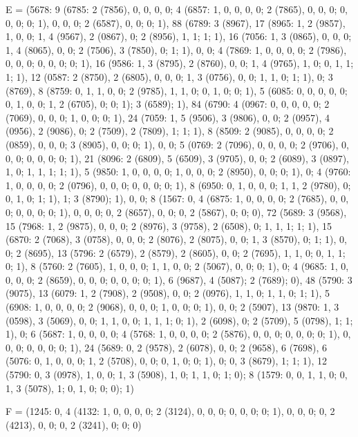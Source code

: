 {E = (5678: 9 (6785: 2 (7856), 0, 0, 0, 0; 4 (6857: 1, 0, 0, 0, 0; 2 (7865), 0, 0, 0; 0, 0, 0; 0; 1), 0, 0, 0; 2 (6587), 0, 0; 0; 1), 88 (6789: 3 (8967), 17 (8965: 1, 2 (9857), 1, 0, 0; 1, 4 (9567), 2 (0867), 0; 2 (8956), 1, 1; 1; 1), 16 (7056: 1, 3 (0865), 0, 0, 0; 1, 4 (8065), 0, 0; 2 (7506), 3 (7850), 0; 1; 1), 0, 0; 4 (7869: 1, 0, 0, 0, 0; 2 (7986), 0, 0, 0; 0, 0, 0; 0; 1), 16 (9586: 1, 3 (8795), 2 (8760), 0, 0; 1, 4 (9765), 1, 0; 0, 1, 1; 1; 1), 12 (0587: 2 (8750), 2 (6805), 0, 0, 0; 1, 3 (0756), 0, 0; 1, 1, 0; 1; 1), 0; 3 (8769), 8 (8759: 0, 1, 1, 0, 0; 2 (9785), 1, 1, 0; 0, 1, 0; 0; 1), 5 (6085: 0, 0, 0, 0, 0; 0, 1, 0, 0; 1, 2 (6705), 0; 0; 1); 3 (6589); 1), 84 (6790: 4 (0967: 0, 0, 0, 0, 0; 2 (7069), 0, 0, 0; 1, 0, 0; 0; 1), 24 (7059: 1, 5 (9506), 3 (9806), 0, 0; 2 (0957), 4 (0956), 2 (9086), 0; 2 (7509), 2 (7809), 1; 1; 1), 8 (8509: 2 (9085), 0, 0, 0, 0; 2 (0859), 0, 0, 0; 3 (8905), 0, 0; 0; 1), 0, 0; 5 (0769: 2 (7096), 0, 0, 0, 0; 2 (9706), 0, 0, 0; 0, 0, 0; 0; 1), 21 (8096: 2 (6809), 5 (6509), 3 (9705), 0, 0; 2 (6089), 3 (0897), 1, 0; 1, 1, 1; 1; 1), 5 (9850: 1, 0, 0, 0, 0; 1, 0, 0, 0; 2 (8950), 0, 0; 0; 1), 0; 4 (9760: 1, 0, 0, 0, 0; 2 (0796), 0, 0, 0; 0, 0, 0; 0; 1), 8 (6950: 0, 1, 0, 0, 0; 1, 1, 2 (9780), 0; 0, 1, 0; 1; 1), 1; 3 (8790); 1), 0, 0; 8 (1567: 0, 4 (6875: 1, 0, 0, 0, 0; 2 (7685), 0, 0, 0; 0, 0, 0; 0; 1), 0, 0, 0; 0, 2 (8657), 0, 0; 0, 2 (5867), 0; 0; 0), 72 (5689: 3 (9568), 15 (7968: 1, 2 (9875), 0, 0, 0; 2 (8976), 3 (9758), 2 (6508), 0; 1, 1, 1; 1; 1), 15 (6870: 2 (7068), 3 (0758), 0, 0, 0; 2 (8076), 2 (8075), 0, 0; 1, 3 (8570), 0; 1; 1), 0, 0; 2 (8695), 13 (5796: 2 (6579), 2 (8579), 2 (8605), 0, 0; 2 (7695), 1, 1, 0; 0, 1, 1; 0; 1), 8 (5760: 2 (7605), 1, 0, 0, 0; 1, 1, 0, 0; 2 (5067), 0, 0; 0; 1), 0; 4 (9685: 1, 0, 0, 0, 0; 2 (8659), 0, 0, 0; 0, 0, 0; 0; 1), 6 (9687), 4 (5087); 2 (7689); 0), 48 (5790: 3 (9075), 13 (6079: 1, 2 (7908), 2 (9508), 0, 0; 2 (0976), 1, 1, 0; 1, 1, 0; 1; 1), 5 (6908: 1, 0, 0, 0, 0; 2 (9068), 0, 0, 0; 1, 0, 0; 0; 1), 0, 0; 2 (5907), 13 (9870: 1, 3 (0598), 3 (5069), 0, 0; 1, 1, 0, 0; 1, 1, 1; 0; 1), 2 (6098), 0; 2 (5709), 5 (0798), 1; 1; 1), 0; 6 (5687: 1, 0, 0, 0, 0; 4 (5768: 1, 0, 0, 0, 0; 2 (5876), 0, 0, 0; 0, 0, 0; 0; 1), 0, 0, 0; 0, 0, 0; 0; 1), 24 (5689: 0, 2 (9578), 2 (6078), 0, 0; 2 (9658), 6 (7698), 6 (5076: 0, 1, 0, 0, 0; 1, 2 (5708), 0, 0; 0, 1, 0; 0; 1), 0; 0, 3 (8679), 1; 1; 1), 12 (5790: 0, 3 (0978), 1, 0, 0; 1, 3 (5908), 1, 0; 1, 1, 0; 1; 0); 8 (1579: 0, 0, 1, 1, 0; 0, 1, 3 (5078), 1; 0, 1, 0; 0; 0); 1)

F = (1245: 0, 4 (4132: 1, 0, 0, 0, 0; 2 (3124), 0, 0, 0; 0, 0, 0; 0; 1), 0, 0, 0; 0, 2 (4213), 0, 0; 0, 2 (3241), 0; 0; 0)

}
